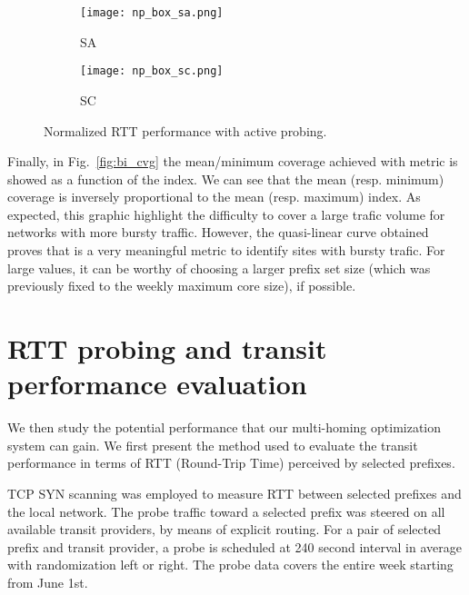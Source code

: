 \documentclass[10pt, conference,letterpaper]{IEEEtran}
\begin{document}
\begin{figure*}[!tb]
\centering
		\centering
        \begin{subfigure}[b]{0.49\textwidth}
        \centering
                \texttt{[image: np\_box\_sa.png]}
                \caption{SA}
                \label{fig:np_sa}
        \end{subfigure}
        \hfill
        \begin{subfigure}[b]{0.49\textwidth}
        \centering
                \texttt{[image: np\_box\_sc.png]}
                \caption{SC}
                \label{fig:np_sc}
        \end{subfigure}

\caption{Normalized RTT performance with active probing.} \label{fig:np}
\end{figure*}


Finally, in Fig.~\ref{fig:bi_cvg} the mean/minimum coverage achieved with  metric is showed as a function of the  index. We can see that the mean (resp. minimum) coverage is inversely proportional to the mean (resp. maximum)  index. As expected, this graphic highlight the difficulty to cover a large trafic volume for networks with more bursty traffic. However, the quasi-linear curve obtained proves that  is a very meaningful metric to identify sites with bursty trafic. For large  values, it can be worthy of choosing a larger prefix set size (which was previously fixed to the weekly maximum core size), if possible. 


\section{RTT probing and transit performance evaluation}
\label{sec:rtt}



We then study the potential performance that our multi-homing optimization system can gain. We first present the method used to evaluate the transit performance in terms of RTT (Round-Trip Time) perceived by selected prefixes.



TCP SYN scanning was employed to measure RTT between selected prefixes and the local network.
The probe traffic toward a selected prefix was steered on all available transit providers, by means of explicit routing.
For a pair of selected prefix and transit provider, a probe is scheduled at 240 second interval in average with  randomization left or right. 
The probe data covers the entire week starting from June 1st.
\end{document}
